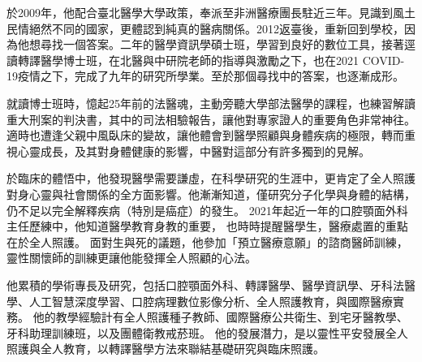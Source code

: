 \documentclass{letter}
\begin{document}
\begin{letter}
於2009年，他配合臺北醫學大學政策，奉派至非洲醫療團長駐近三年。見識到風土民情絕然不同的國家，更體認到純真的醫病關係。2012返臺後，重新回到學校，因為他想尋找一個答案。二年的醫學資訊學碩士班，學習到良好的數位工具，接著逕讀轉譯醫學博士班，在北醫與中研院老師的指導與激勵之下，也在2021 COVID-19疫情之下，完成了九年的研究所學業。至於那個尋找中的答案，也逐漸成形。


就讀博士班時，憶起25年前的法醫魂，主動旁聽大學部法醫學的課程，也練習解讀重大刑案的判決書，其中的司法相驗報告，讓他對專家證人的重要角色非常神往。
適時也遭逢父親中風臥床的變故，讓他體會到醫學照顧與身體疾病的極限，轉而重視心靈成長，及其對身體健康的影響，中醫對這部分有許多獨到的見解。

於臨床的體悟中，他發現醫學需要謙虛，在科學研究的生涯中，更肯定了全人照護對身心靈與社會關係的全方面影響。他漸漸知道，僅研究分子化學與身體的結構，仍不足以完全解釋疾病（特別是癌症）的發生。
2021年起近一年的口腔顎面外科主任歷練中，他知道醫學教育身教的重要，%
也時時提醒醫學生，醫療處置的重點在於全人照護。 %
面對生與死的議題，他參加「預立醫療意願」的諮商醫師訓練，靈性關懷師的訓練更讓他能發揮全人照顧的心法。

他累積的學術專長及研究，包括口腔顎面外科、轉譯醫學、醫學資訊學、牙科法醫學、人工智慧深度學習、口腔病理數位影像分析、全人照護教育，與國際醫療實務。
他的教學經驗計有全人照護種子教師、國際醫療公共衛生、到宅牙醫教學、牙科助理訓練班，以及團體衛教戒菸班。
他的發展潛力，是以靈性平安發展全人照護與全人教育，以轉譯醫學方法來聯結基礎研究與臨床照護。


\end{letter}
\end{document}
